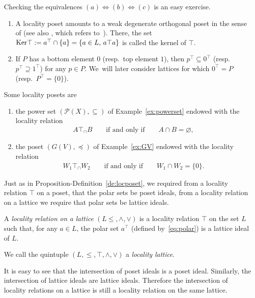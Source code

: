 \documentclass[10pt,a4paper]{amsart}
\numberwithin{equation}{section}
\newcommand{\loc}{locality\xspace}
\begin{document}
Checking the equivalences $(a)\Leftrightarrow (b)\Leftrightarrow (c)$ is an easy exercise.

\begin{Remark}\qquad
\begin{enumerate}\itemsep=0pt
\item[$(a)$] A locality poset %
amounts to a weak degenerate orthogonal poset in the sense of \cite[Defi\-nition 2.1]{CM} (see also \cite[supplementary Remark~6 in~Section~16]{K}, which refers to~\cite{Sz1}). There, the set ${\rm Ker} \top:=a^\top\cap \{a\}=\{a\in L, \, a\top a\}$ is called the kernel of $\top$.
\item[$(b)$] If $P$ has a bottom element $0$ (resp.~top element $1$), then $p^\top\subseteq 0^\top $ (resp.~$p^\top\supseteq 1^\top $) for any $p\in P$. We~will later consider lattices for which $0^\top=P$ (resp.~$P^\top=\{0\}$).
\end{enumerate}
\end{Remark}

{\samepage\begin{Example} \label{ex:locposetex}
Some locality posets %
are
\begin{enumerate}\itemsep=0pt
\item[$(a)$] the power set $\left({\mathcal P}(X), \subseteq \right)$ of Example~\ref{ex:powerset} endowed with the \loc relation
	\begin{gather*}
	A\top_\cap B\qquad\text{if and only if}\qquad A\cap B=\varnothing,
	\end{gather*}
\item[$(b)$] the \subsp poset $(G(V), \preceq)$ of Example~\ref{ex:GV}
	endowed with the \loc relation
	\begin{gather*}
	W_1\top_\cap W_2\qquad\text{if and only if}\qquad W_1\cap W_2=\{0\}.
	\end{gather*}
\end{enumerate}
	\end{Example}

}

Just as in Proposition-Definition~\ref{de:locposet}, we required from a locality relation $\top$ on a poset, that the polar sets be poset ideals, from a locality relation on a lattice we require that polar sets be lattice ideals.

\begin{Definition} \label{def:loclattice} A {\it \loc relation on a lattice} $(L\leq,\wedge,\vee)$ is a \loc relation $\top$ on the set $L$ such that, for any $a\in L$, the polar set $a^\top$ (defined by~\eqref{eq:polar}) is a lattice ideal of $L$.

	We call the
quintuple $(L, \leq, \top, \wedge, \vee) $ a {\it \loc lattice}.
\end{Definition}
\begin{Remark} %
 It is easy to see that the intersection of poset ideals is a poset ideal. Similarly, the intersection of lattice ideals are lattice ideals. Therefore the intersection of locality relations on a lattice is still a locality relation on the same lattice.
 \end{Remark}
\end{document}
